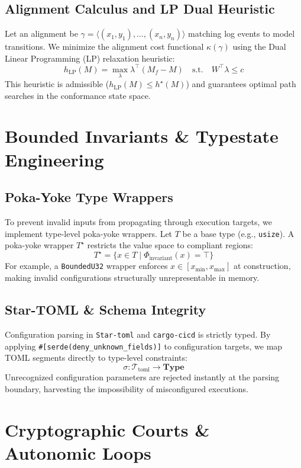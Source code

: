 \documentclass[11pt,a4paper,oneside]{book}
\begin{document}
\section{Alignment Calculus and LP Dual Heuristic}
Let an alignment be $\gamma = \langle (x_1, y_1), \dots, (x_n, y_n) \rangle$ matching log events to model transitions. We minimize the alignment cost functional $\kappa(\gamma)$ using the Dual Linear Programming (LP) relaxation heuristic:
\[
h_{\mathrm{LP}}(M) = \max_{\lambda} \lambda^{\top} (M_f - M) \quad \text{s.t.} \quad W^{\top} \lambda \le c
\]
This heuristic is admissible ($h_{\mathrm{LP}}(M) \le h^{\star}(M)$) and guarantees optimal path searches in the conformance state space.

\chapter{Bounded Invariants \& Typestate Engineering}

\section{Poka-Yoke Type Wrappers}
To prevent invalid inputs from propagating through execution targets, we implement type-level poka-yoke wrappers. Let $T$ be a base type (e.g., \texttt{usize}). A poka-yoke wrapper $T^{\star}$ restricts the value space to compliant regions:
\[
T^{\star} = \{ x \in T \mid \Phi_{\mathrm{invariant}}(x) = \top \}
\]
For example, a \texttt{BoundedU32} wrapper enforces $x \in [x_{\mathrm{min}}, x_{\mathrm{max}}]$ at construction, making invalid configurations structurally unrepresentable in memory.

\section{Star-TOML \& Schema Integrity}
Configuration parsing in \texttt{Star-toml} and \texttt{cargo-cicd} is strictly typed. By applying \verb|#[serde(deny_unknown_fields)]| to configuration targets, we map TOML segments directly to type-level constraints:
\[
\sigma: \mathcal{T}_{\mathrm{toml}} \to \mathbf{Type}
\]
Unrecognized configuration parameters are rejected instantly at the parsing boundary, harvesting the impossibility of misconfigured executions.

\chapter{Cryptographic Courts \& Autonomic Loops}
\end{document}

